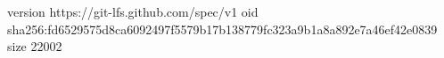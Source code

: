 version https://git-lfs.github.com/spec/v1
oid sha256:fd6529575d8ca6092497f5579b17b138779fc323a9b1a8a892e7a46ef42e0839
size 22002
